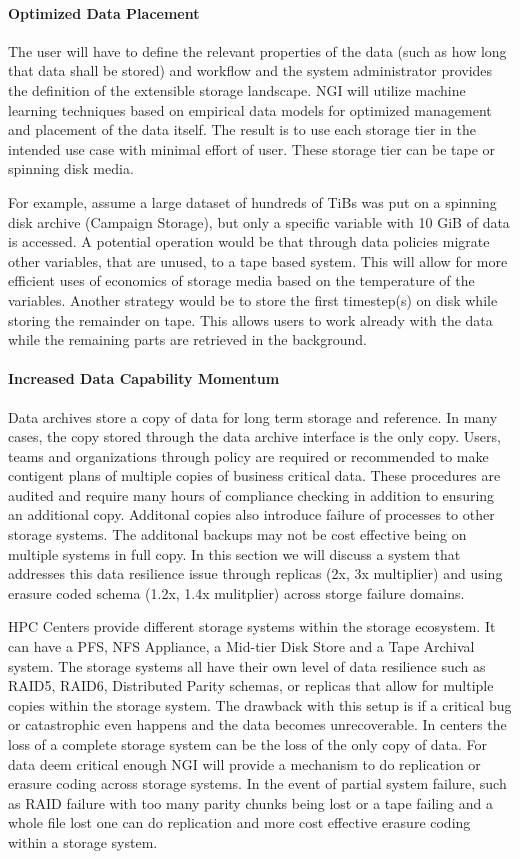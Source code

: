 \documentclass[a4paper, twocolumn]{article}
\begin{document}
\paragraph{Optimized Data Placement}
The user will have to define the relevant properties of the data (such as how long that data shall be stored) and workflow and the system administrator provides the definition of the extensible storage landscape.
NGI will utilize machine learning techniques based on empirical data models for optimized management and placement of the data itself.
The result is to use each storage tier in the intended use case with minimal effort of user.
These storage tier can be tape or spinning disk media.

For example, assume a large dataset of hundreds of TiBs was put on a spinning disk archive (Campaign Storage), but only a specific variable with 10 GiB of data is accessed.
A potential operation would be that through data policies migrate other variables, that are unused, to a tape based system.
This will allow for more efficient uses of economics of storage media based on the temperature of the variables.
Another strategy would be to store the first timestep(s) on disk while storing the remainder on tape.
This allows users to work already with the data while the remaining parts are retrieved in the background.


\paragraph{Increased Data Capability Momentum}
Data archives store a copy of data for long term storage and reference.
In many cases, the copy stored through the data archive interface is the only copy.
Users, teams and organizations through policy are required or recommended to make contigent plans of multiple copies of business critical data.
These procedures are audited and require many hours of compliance checking in addition to ensuring an additional copy.
Additonal copies also introduce failure of processes to other storage systems.
The additonal backups may not be cost effective being on multiple systems in full copy.
In this section we will discuss a system that addresses this data resilience issue through replicas (2x, 3x multiplier) and using erasure coded schema (1.2x, 1.4x mulitplier) across storge failure domains.

HPC Centers provide different storage systems within the storage ecosystem.
It can have a PFS, NFS Appliance, a Mid-tier Disk Store and a Tape Archival system.
The storage systems all have their own level of data resilience such as RAID5, RAID6, Distributed Parity schemas, or replicas that allow for multiple copies within the storage system.
The drawback with this setup is if a critical bug or catastrophic even happens and the data becomes unrecoverable.
In centers the loss of a complete storage system can be the loss of the only copy of data.
For data deem critical enough NGI will provide a mechanism to do replication or erasure coding across storage systems.
In the event of partial system failure, such as RAID failure with too many parity chunks being lost or a tape failing and a whole file lost one can do replication and more cost effective erasure coding within a storage system.
\end{document}
